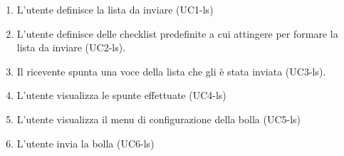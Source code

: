 \begin{itemize}
\begin{enumerate}
\item L'utente definisce la lista da inviare (UC1-ls)

\item L'utente definisce delle checklist predefinite a cui attingere per formare la lista da inviare (UC2-ls).

\item Il ricevente spunta una voce della lista che gli è stata inviata (UC3-ls).

\item L'utente visualizza le spunte effettuate (UC4-ls)

\item L'utente visualizza il menu di configurazione della bolla (UC5-ls)
\item L'utente invia la bolla (UC6-ls)


\end{enumerate} 
\end{itemize}

\clearpage

